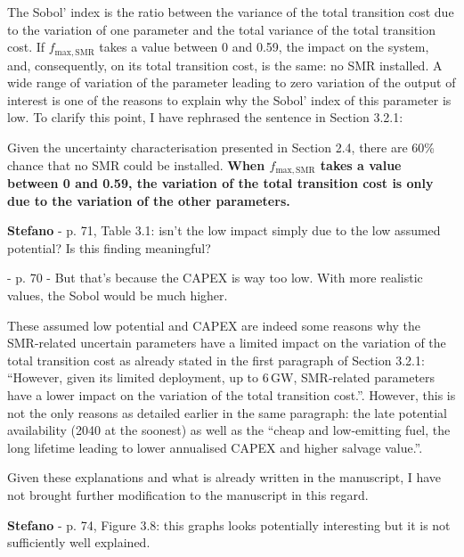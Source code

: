 \documentclass[12pt,a4paper]{article}
\begin{document}
\noindent The Sobol' index is the ratio between the variance of the total transition cost due to the variation of one parameter and the total variance of the total transition cost. If $f_{\mathrm{max,SMR}}$ takes a value between 0 and 0.59, the impact on the system, and, consequently, on its total transition cost, is the same: no SMR installed. A wide range of variation of the parameter leading to zero variation of the output of interest is one of the reasons to explain why the Sobol' index of this parameter is low. To clarify this point, I have rephrased the sentence {\color{blue}in Section 3.2.1}:

\begin{mdframed}[style=manuscript] %
Given the uncertainty characterisation presented in Section 2.4, there are 60\% chance that no SMR could be installed. \textbf{When $f_{\mathrm{max,SMR}}$ takes a value between 0 and 0.59, the variation of the total transition cost is only due to the variation of the other parameters. }
\end{mdframed}

\begin{mdframed}[style=comment] %
{\color{orange} \textbf{Stefano}} - p. 71, Table 3.1: isn’t the low impact simply due to the low assumed potential? Is this finding meaningful?

 - p. 70 - But that's because the CAPEX is way too low. With more realistic values, the Sobol would be much higher.
\end{mdframed}

\noindent These assumed low potential and CAPEX are indeed some reasons why the SMR-related uncertain parameters have a limited impact on the variation of the total transition cost as already stated in the first paragraph of Section 3.2.1: ``However, given its limited deployment, up to 6\,GW, SMR-related parameters have a lower impact on the variation of the total transition cost.''. However, this is not the only reasons as detailed earlier in the same paragraph: the late potential availability (2040 at the soonest) as well as the ``cheap and low-emitting fuel, the long lifetime leading to lower annualised CAPEX and higher salvage value.''. 

Given these explanations and what is already written in the manuscript, I have not brought further modification to the manuscript in this regard.

\begin{mdframed}[style=comment] %
{\color{orange} \textbf{Stefano}} - p. 74, Figure 3.8: this graphs looks potentially interesting but it is not sufficiently well explained.
\end{mdframed}
\end{document}

